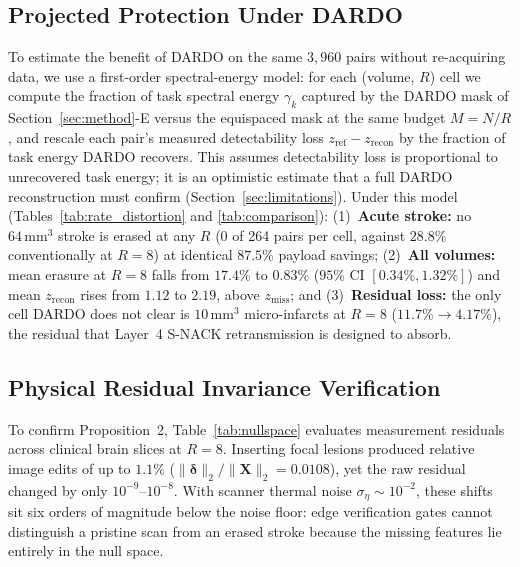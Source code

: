\documentclass[conference]{IEEEtran}
\begin{document}
\subsection{Projected Protection Under DARDO}
\label{sec:dardo_results}
To estimate the benefit of DARDO on the same $3{,}960$ pairs without re-acquiring data, we use a first-order spectral-energy model: for each (volume, $R$) cell we compute the fraction of task spectral energy $\gamma_k$ captured by the DARDO mask of Section~\ref{sec:method}-E versus the equispaced mask at the same budget $M = N/R$, and rescale each pair's measured detectability loss $z_{\text{ref}} - z_{\text{recon}}$ by the fraction of task energy DARDO recovers. This assumes detectability loss is proportional to unrecovered task energy; it is an optimistic estimate that a full DARDO reconstruction must confirm (Section~\ref{sec:limitations}). Under this model (Tables~\ref{tab:rate_distortion} and \ref{tab:comparison}): (1)~\textbf{Acute stroke:} no $64\,\text{mm}^3$ stroke is erased at any $R$ (0 of 264 pairs per cell, against $28.8\%$ conventionally at $R=8$) at identical $87.5\%$ payload savings; (2)~\textbf{All volumes:} mean erasure at $R=8$ falls from $17.4\%$ to $\mathbf{0.83\%}$ ($95\%$ CI $[0.34\%, 1.32\%]$) and mean $z_{\text{recon}}$ rises from $1.12$ to $2.19$, above $z_{\text{miss}}$; and (3)~\textbf{Residual loss:} the only cell DARDO does not clear is $10\,\text{mm}^3$ micro-infarcts at $R=8$ ($11.7\% \to 4.17\%$), the residual that Layer~4 S-NACK retransmission is designed to absorb.

\subsection{Physical Residual Invariance Verification}
To confirm Proposition~2, Table~\ref{tab:nullspace} evaluates measurement residuals across clinical brain slices at $R=8$. Inserting focal lesions produced relative image edits of up to $1.1\%$ ($\|\boldsymbol{\delta}\|_2 / \|\mathbf{X}\|_2 = 0.0108$), yet the raw residual changed by only $10^{-9}$--$10^{-8}$. With scanner thermal noise $\sigma_\eta \sim 10^{-2}$, these shifts sit six orders of magnitude below the noise floor: edge verification gates cannot distinguish a pristine scan from an erased stroke because the missing features lie entirely in the null space.
\end{document}

